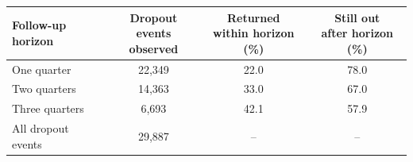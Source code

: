 \begin{tabular}{l c c c}
\hline\hline
Follow-up horizon & \shortstack{Dropout events \\ observed} & \shortstack{Returned \\ within horizon (\%)} & \shortstack{Still out \\ after horizon (\%)} \\
\hline
One quarter &    22,349 & 22.0 & 78.0 \\
Two quarters &    14,363 & 33.0 & 67.0 \\
Three quarters &     6,693 & 42.1 & 57.9 \\
\hline
All dropout events &    29,887 & -- & -- \\
\hline\hline
\end{tabular}
